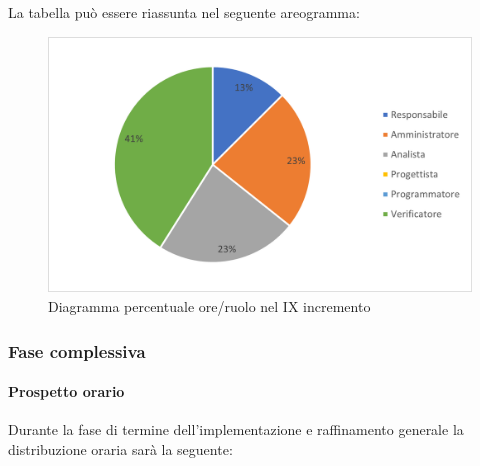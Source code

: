 La tabella può essere riassunta nel seguente areogramma:
\begin{figure}[H]
	\centering
	\includegraphics[width=0.8\linewidth]{res/images/preventivo/dettaglio_analisi/2-2.png}
	\caption{Diagramma percentuale ore/ruolo nel IX incremento}
	\label{fig:diagramma costi ruolo IX incremento}
\end{figure}
\subsubsection{Fase complessiva}

\paragraph{Prospetto orario}
Durante la fase di termine dell'implementazione e raffinamento generale la distribuzione oraria sarà la seguente:

